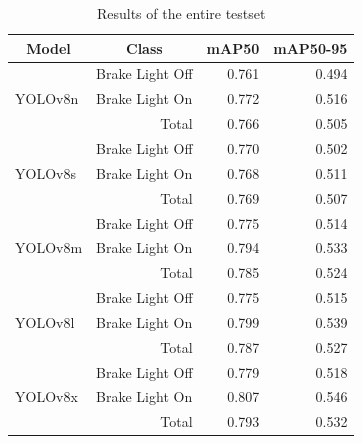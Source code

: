 \begin{table}[!h]
    \caption{Results of the entire testset}
    \label{tab:total}
    \begin{tabular}{llrr}
    \toprule
    \multicolumn{1}{c}{Model} & \multicolumn{1}{c}{Class} & \multicolumn{1}{c}{mAP50} & \multicolumn{1}{c}{mAP50-95} \\
    \midrule
    \multirow{3}{*}{YOLOv8n}  & Brake Light Off           & 0.761                     & 0.494                          \\
                              & Brake Light On            & 0.772                     & 0.516                        \\
                              & \multicolumn{1}{r}{Total} & 0.766                     & 0.505                        \\
    \midrule
    \multirow{3}{*}{YOLOv8s}  & Brake Light Off           & 0.770                     & 0.502                        \\
                              & Brake Light On            & 0.768                     & 0.511                        \\
                              & \multicolumn{1}{r}{Total} & 0.769                     & 0.507                        \\
    \midrule
    \multirow{3}{*}{YOLOv8m}  & Brake Light Off           & 0.775                     & 0.514                         \\
                              & Brake Light On            & 0.794                     & 0.533                        \\
                              & \multicolumn{1}{r}{Total} & 0.785                     & 0.524                        \\
    \midrule
    \multirow{3}{*}{YOLOv8l}  & Brake Light Off           & 0.775                     & 0.515                         \\
                              & Brake Light On            & 0.799                     & 0.539                        \\
                              & \multicolumn{1}{r}{Total} & 0.787                     & 0.527                      \\
    \midrule
    \multirow{3}{*}{YOLOv8x}  & Brake Light Off           & 0.779                     & 0.518                         \\
                              & Brake Light On            & 0.807                     & 0.546                        \\
                              & \multicolumn{1}{r}{Total} & 0.793                     & 0.532                      \\
    \bottomrule
    \end{tabular}%
\end{table}


